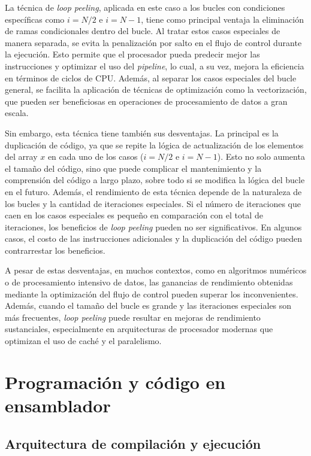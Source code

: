 \documentclass[11pt,a4paper,twoside]{article}
\theoremstyle{definition}
\begin{document}
	La técnica de \textit{loop peeling}, aplicada en este caso a los bucles con condiciones específicas como $i = N/2$ e $i = N - 1$, tiene como principal ventaja la eliminación de ramas condicionales dentro del bucle. Al tratar estos casos especiales de manera separada, se evita la penalización por salto en el flujo de control durante la ejecución. Esto permite que el procesador pueda predecir mejor las instrucciones y optimizar el uso del \textit{pipeline}, lo cual, a su vez, mejora la eficiencia en términos de ciclos de CPU. Además, al separar los casos especiales del bucle general, se facilita la aplicación de técnicas de optimización como la vectorización, que pueden ser beneficiosas en operaciones de procesamiento de datos a gran escala.
	
	Sin embargo, esta técnica tiene también sus desventajas. La principal es la duplicación de código, ya que se repite la lógica de actualización de los elementos del array $x$ en cada uno de los casos ($i = N/2$ e $i = N - 1$). Esto no solo aumenta el tamaño del código, sino que puede complicar el mantenimiento y la comprensión del código a largo plazo, sobre todo si se modifica la lógica del bucle en el futuro. Además, el rendimiento de esta técnica depende de la naturaleza de los bucles y la cantidad de iteraciones especiales. Si el número de iteraciones que caen en los casos especiales es pequeño en comparación con el total de iteraciones, los beneficios de \textit{loop peeling} pueden no ser significativos. En algunos casos, el costo de las instrucciones adicionales y la duplicación del código pueden contrarrestar los beneficios.
	
	A pesar de estas desventajas, en muchos contextos, como en algoritmos numéricos o de procesamiento intensivo de datos, las ganancias de rendimiento obtenidas mediante la optimización del flujo de control pueden superar los inconvenientes. Además, cuando el tamaño del bucle es grande y las iteraciones especiales son más frecuentes, \textit{loop peeling} puede resultar en mejoras de rendimiento sustanciales, especialmente en arquitecturas de procesador modernas que optimizan el uso de caché y el paralelismo.
	
	
	\section{Programación y código en ensamblador}
	
	\subsection{Arquitectura de compilación y ejecución}
	
\end{document}

